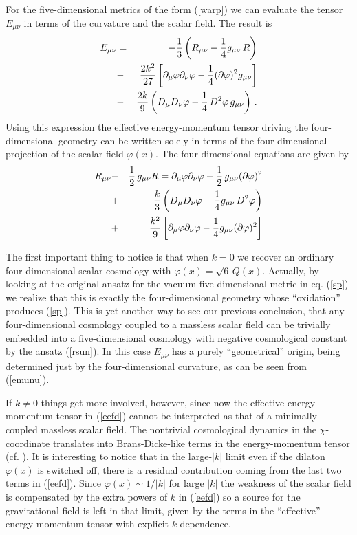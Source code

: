 \documentclass[prd,a4paper,twocolumn,superscriptaddress,nofootinbib,showpacs]{revtex4}
\def\half{{1\over 2}\,}
\begin{document}
For the five-dimensional metrics of the form (\ref{warp}) we can evaluate the tensor $E_{\mu\nu}$ in terms of the 
curvature and the scalar field. The result is
\begin{eqnarray}
E_{\mu\nu}&=&-{1\over 3}\left(R_{\mu\nu}-{1\over 4}g_{\mu\nu}\,R\right)\nonumber \\
&-&{2k^2\over 27}\left[\partial_{\mu}\varphi
\partial_{\nu}\varphi-{1\over 4}(\partial\varphi)^2 g_{\mu\nu}\right] \nonumber \\
&-&{2k\over 9}\left(D_{\mu}D_{\nu}\varphi-{1\over 4}\,D^2\varphi\,g_{\mu\nu}\right)\, .
\label{emunu}
\end{eqnarray}
Using this expression the effective energy-momentum tensor driving the four-dimensional geometry can be written 
solely in terms of the four-dimensional projection of the scalar field
$\varphi(x)$. The four-dimensional equations 
are given by
\begin{eqnarray}
R_{\mu\nu}&-&\half g_{\mu\nu}R =\partial_{\mu}\varphi\partial_{\nu}\varphi-\half g_{\mu\nu}(\partial\varphi)^2 
\nonumber \\
&+&{k\over 3}\left(D_{\mu}D_{\nu}\varphi-{1\over 4}g_{\mu\nu}\,D^2\varphi\right) \nonumber \\
&+&{k^2\over 9}\left[\partial_{\mu}\varphi\partial_{\nu}\varphi-{1\over 4}g_{\mu\nu}(\partial\varphi)^2\right]
\label{eefd}
\end{eqnarray}

The first important thing to notice is that when $k=0$ we recover an ordinary four-dimensional scalar cosmology
with $\varphi(x)=\sqrt{6}\,Q(x)$. Actually,
by looking at the original ansatz for the vacuum five-dimensional metric in eq. (\ref{sp}) we realize that this is exactly the 
four-dimensional geometry whose ``oxidation'' produces (\ref{sp}). This
is yet another way to see our previous conclusion, that any four-dimensional cosmology coupled
to a massless scalar field can be trivially embedded into a five-dimensional cosmology with negative cosmological constant by
the ansatz (\ref{rsun}). In this case $E_{\mu\nu}$ has a purely ``geometrical'' origin, being determined just by the 
four-dimensional curvature, as can be seen from (\ref{emunu}). 

If $k\neq 0$ things get more involved, however, since now the effective energy-momentum tensor 
in (\ref{eefd}) cannot be interpreted as that of a minimally coupled massless scalar field. The nontrivial cosmological
dynamics in the $\chi$-coordinate translates into Brans-Dicke-like terms in the energy-momentum tensor (cf. \cite{eft}). 
It is interesting to notice that in the large-$|k|$ limit even if the dilaton $\varphi(x)$ is switched off, there
is a residual contribution coming from the last two terms in (\ref{eefd}). Since $\varphi(x)\sim 1/|k|$ for large $|k|$
the weakness of the scalar field is compensated by the extra powers of $k$ in (\ref{eefd}) so a source for the gravitational
field is left in that limit, given by the terms in the ``effective'' energy-momentum tensor with explicit $k$-dependence.          
\end{document}
